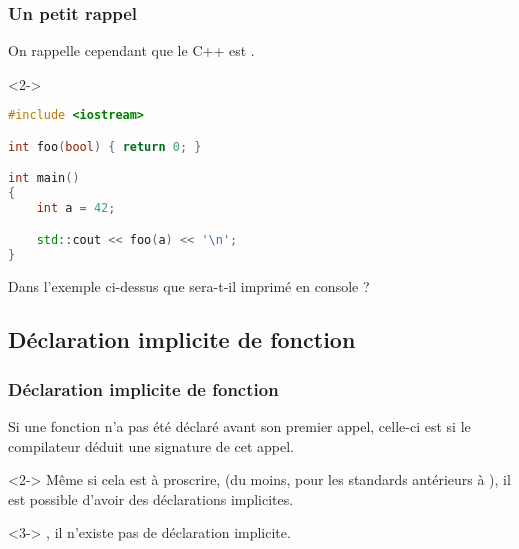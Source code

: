 \documentclass{cppcourses}
\begin{document}
\begin{frame}[fragile]

\frametitle{Un petit rappel}

\begin{warning}
On rappelle cependant que le C++ est .
\end{warning}

\begin{example}<2->

\begin{lstlisting}[language = c++]
#include <iostream>

int foo(bool) { return 0; }

int main()
{
    int a = 42;

    std::cout << foo(a) << '\n';
}
\end{lstlisting}

Dans l'exemple ci-dessus que sera-t-il imprimé en console ?


\end{example}

\end{frame}

\subsection{Déclaration implicite de fonction}

\begin{frame}

\frametitle{Déclaration implicite de fonction}

\begin{definition}
Si une fonction n'a pas été déclaré avant son premier appel, celle-ci est  si le compilateur déduit une signature de cet appel.
\end{definition}

\begin{remark}<2->
Même si cela est à proscrire,  (du moins, pour les standards antérieurs à ), il est possible d'avoir des déclarations implicites.
\end{remark}

\begin{remark}<3->
, il n'existe pas de déclaration implicite.
\end{remark}

\end{frame}
\end{document}
